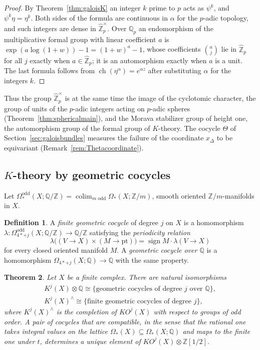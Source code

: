 \documentclass[11pt]{amsart}
\theoremstyle{plain}
\newtheorem{theorem}{Theorem}[section]
\theoremstyle{definition}
\newtheorem{definition}[theorem]{Definition}
\numberwithin{equation}{section}
\newcommand{\Z}{\mathbb{Z}}
\newcommand{\Q}{\mathbb{Q}}
\newcommand{\Zhat}{\widehat{\mathbb{Z}}}
\newcommand{\KO}{\mathit{KO}}
\newcommand{\units}{^{\times}}
\DeclareMathOperator{\sign}{sign}
\DeclareMathOperator{\ch}{ch}
\DeclareMathOperator{\colim}{colim}
\begin{document}
\begin{proof}
By Theorem~\ref{thm:galoisK} an integer $k$ prime to $p$ acts as $\psi^k$, and $\psi^k\eta=\eta^k$.
Both sides of the formula are continuous in $\alpha$ for the $p$-adic topology, and such integers are dense in $\Zhat_p\units$.
Over $\Q_p$ an endomorphism of the multiplicative formal group with linear coefficient $a$ is $\exp(a\log(1+w))-1=(1+w)^a-1$, whose coefficients $\binom aj$ lie in $\Zhat_p$ for all $j$ exactly when $a\in\Zhat_p$; it is an automorphism exactly when $a$ is a unit.
The last formula follows from $\ch(\eta^\alpha)=e^{\alpha z}$ after substituting $\alpha$ for the integers $k$.
\end{proof}

Thus the group $\Zhat_p\units$ is at the same time the image of the cyclotomic character, the group of units of the $p$-adic integers acting on $p$-adic spheres (Theorem~\ref{thm:sphericalmain}), and the Morava stabilizer group of height one, the automorphism group of the formal group of $K$-theory.
The cocycle $\Theta$ of Section~\ref{sec:galoisbundles} measures the failure of the coordinate $x_\Delta$ to be equivariant (Remark~\ref{rem:Thetacoordinate}).

\subsection{$K$-theory by geometric cocycles}
Let $\Omega^{\mathrm{odd}}_*(X;\Q/\Z)=\colim_{m\text{ odd}}\Omega_*(X;\Z/m)$, smooth oriented $\Z/m$-manifolds in $X$.

\begin{definition}
A \emph{finite geometric cocycle} of degree $j$ on $X$ is a homomorphism $\lambda\colon\Omega^{\mathrm{odd}}_{4*+j}(X;\Q/\Z)\to\Q/\Z$ satisfying the \emph{periodicity relation}
\[
\lambda\bigl((V\to X)\times(M\to\mathrm{pt})\bigr)=\sign M\cdot\lambda(V\to X)
\]
for every closed oriented manifold $M$.
A \emph{geometric cocycle over $\Q$} is a homomorphism $\Omega_{4*+j}(X;\Q)\to\Q$ with the same property.
\end{definition}

\begin{theorem}\label{thm:geomcocycles}
Let $X$ be a finite complex.
There are natural isomorphisms
\begin{gather*}
K^j(X)\otimes\Q\cong\{\text{geometric cocycles of degree }j\text{ over }\Q\},\\
K^j(X)^\wedge\cong\{\text{finite geometric cocycles of degree }j\},
\end{gather*}
where $K^j(X)^\wedge$ is the completion of $\KO^j(X)$ with respect to groups of odd order.
A pair of cocycles that are compatible, in the sense that the rational one takes integral values on the lattice $\Omega_*(X)\subseteq\Omega_*(X;\Q)$ and maps to the finite one under $t$, determines a unique element of $\KO^j(X)\otimes\Z[1/2]$.
\end{theorem}
\end{document}
